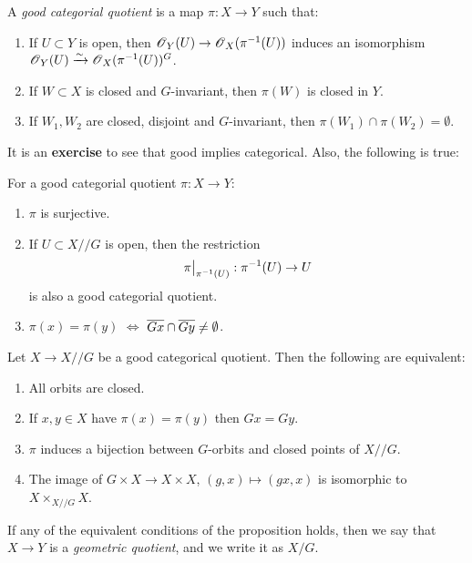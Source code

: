 \documentclass[11pt, english]{article}
\begin{document}
\begin{defi}
A \emph{good categorial quotient} is a map $\pi:X \to Y$ such that:
\begin{enumerate}
\item If $U \subset Y$ is open, then $\operatorname{\mathscr{O}}_Y(U) \to \operatorname{\mathscr{O}}_X(\pi^{-1}(U))$ induces an isomorphism $\operatorname{\mathscr{O}}_Y(U) \xrightarrow{\sim} \operatorname{\mathscr{O}}_X(\pi^{-1}(U))^G$.
\item If $W \subset X$ is closed and $G$-invariant, then $\pi(W)$ is closed in $Y$. 
\item If $W_1,W_2$ are closed, disjoint and $G$-invariant, then $\pi(W_1) \cap \pi(W_2) = \emptyset$.
\end{enumerate}
\end{defi}

It is an \textbf{exercise} to see that good implies categorical. Also, the following is true:
\begin{prop}
For a good categorial quotient $\pi:X \to Y$:
\begin{enumerate}
\item $\pi$ is surjective.
\item If $U \subset X /\!/ G$ is open, then the restriction
\[
\restr{\pi}{\pi^{-1}(U)}:\pi^{-1}(U) \to U
\]
is also a good categorial quotient.
\item $\pi(x)=\pi(y)$ $\Leftrightarrow$ $\overline{Gx} \cap \overline{Gy} \neq \emptyset$.
\end{enumerate}
\end{prop}

\begin{prop}
Let $X \to X /\!/ G$ be a good categorical quotient. Then the following are equivalent:
  \begin{enumerate}
  \item All orbits are closed.
\item If $x, y \in X$ have $\pi(x)=\pi(y)$ then $Gx=Gy$.
\item $\pi$ induces a bijection between $G$-orbits and closed points of $X /\!/ G$.
\item The image of $G \times X \to X \times X$, $(g,x) \mapsto (gx,x)$ is isomorphic to $X \times_{X /\!/ G} X$. 
  \end{enumerate}
\end{prop}

\begin{defi}
  If any of the equivalent conditions of the proposition holds, then we say that $X \to Y$ is a \emph{geometric quotient}, and we write it as $X/G$.
\end{defi}
\end{document}
